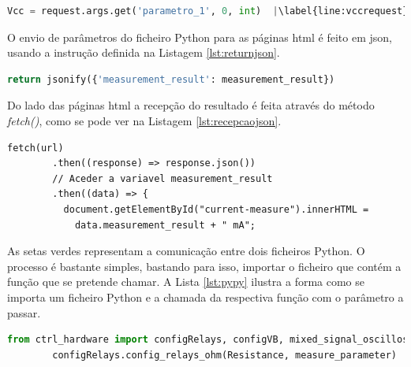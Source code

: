 \begin{minipage}{0.9\linewidth}
	\begin{lstlisting}[language=python, escapechar=|, caption=Recepção de parâmetros, label=lst:metodorequest]
		Vcc = request.args.get('parametro_1', 0, int)  |\label{line:vccrequest}|
	\end{lstlisting}
\end{minipage}

O envio de parâmetros do ficheiro Python para as páginas \acrshort{html} é feito em \acrfull{json}, usando a instrução definida na Listagem \ref{lst:returnjson}.

\begin{minipage}{0.9\linewidth}
	\begin{lstlisting}[language=python, escapechar=|, caption=Envio de parâmetros \textit{views.py} $\rightarrow$ \acrshort{html}, label=lst:returnjson]
		return jsonify({'measurement_result': measurement_result})
	\end{lstlisting}
\end{minipage}

Do lado das páginas \acrshort{html} a recepção do resultado é feita através do método \textit{fetch()}, como se pode ver na Listagem \ref{lst:recepcaojson}.

\begin{minipage}{0.9\linewidth}
	\begin{lstlisting}[language=html, escapechar=|, caption=Recepção de parâmetros, label=lst:recepcaojson]
		fetch(url)
		.then((response) => response.json())
		// Aceder a variavel measurement_result
		.then((data) => {
		  document.getElementById("current-measure").innerHTML = 
		  	data.measurement_result + " mA";	
		\end{lstlisting}
\end{minipage}

As setas verdes representam a comunicação entre dois ficheiros Python. O processo é bastante simples, bastando para isso, importar o ficheiro que contém a função que se pretende chamar. A Lista \ref{lst:pypy} ilustra a forma como se importa um ficheiro Python e a chamada da respectiva função com o parâmetro a passar.

\begin{minipage}{0.9\linewidth}
	\begin{lstlisting}[language=python, escapechar=|, caption=Comunicação Python - Python, label=lst:pypy]
		from ctrl_hardware import configRelays, configVB, mixed_signal_oscilloscope |\label{line:ficheiros}|
		configRelays.config_relays_ohm(Resistance, measure_parameter) |\label{line:trueparameter}|
	\end{lstlisting}
\end{minipage}

